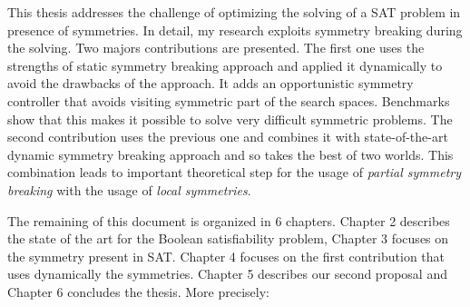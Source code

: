%
%
%

This thesis addresses the challenge of optimizing the solving of a SAT problem in presence of
symmetries. In detail, my research exploits symmetry breaking during the solving.
Two majors contributions are presented. The first one uses the strengths of static symmetry 
breaking approach and applied it dynamically to avoid the drawbacks of the approach. It adds an opportunistic symmetry controller that avoids visiting symmetric part of the search spaces. Benchmarks show that this makes it possible
 to solve very difficult symmetric problems.
The second contribution uses the previous one and combines it with state-of-the-art dynamic 
symmetry breaking approach and so takes the best of two worlds. This combination leads to 
important theoretical step for the usage of \emph{partial symmetry breaking} with the usage of 
\emph{local symmetries}. 
 


The remaining of this document is organized in 6 chapters. Chapter 2 describes the state of
the art for the Boolean satisfiability problem, Chapter 3 focuses on the symmetry present in SAT.
Chapter 4 focuses on the first contribution that uses dynamically the symmetries.
Chapter 5 describes our second proposal and Chapter 6 concludes the thesis. More precisely:
 
